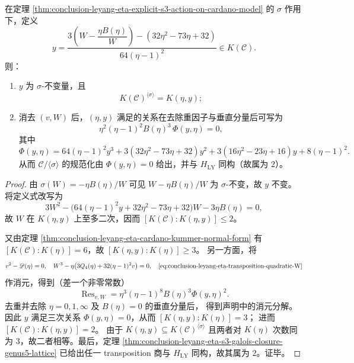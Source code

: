 \begin{theorem}\label{thm:conclusion-leyang-eta-transposition-quotient-explicit-generator}
在定理 \ref{thm:conclusion-leyang-eta-explicit-s3-action-on-cardano-model}
的 \(\sigma\) 作用下，定义
\[
y=\frac{3\left(W-\dfrac{\eta B(\eta)}{W}\right)-(32\eta^2-73\eta+32)}
{64(\eta-1)^2}\in K(\mathcal C).
\]
则：
\begin{enumerate}
  \item \(y\) 为 \(\sigma\)-不变量，且
  \[
  K(\mathcal C)^{\langle\sigma\rangle}=K(\eta,y);
  \]
  \item 消去 \((v,W)\) 后，\((\eta,y)\) 满足的关系在去除重因子与垂直分量后可写为
  \[
  \eta^2(\eta-1)^2B(\eta)^3\,
  \Phi(y,\eta)=0,
  \]
  其中
  \[
  \Phi(y,\eta)
  =64(\eta-1)^2y^3+3(32\eta^2-73\eta+32)y^2
  +3(16\eta^2-23\eta+16)y+8(\eta-1)^2.
  \]
  从而 \(\mathcal C/\langle\sigma\rangle\) 的规范化由
  \(\Phi(y,\eta)=0\) 给出，并与 \(H_{\mathrm{LY}}\) 同构（故属为 \(2\)）。
\end{enumerate}
\end{theorem}
\begin{proof}
由
\(
\sigma(W)=-\eta B(\eta)/W
\)
可见
\(
W-\eta B(\eta)/W
\)
为 \(\sigma\)-不变，故 \(y\) 不变。
将定义式改写为
\begin{equation}\label{eq:conclusion-leyang-eta-transposition-quadratic-W}
3W^2-\bigl(64(\eta-1)^2y+32\eta^2-73\eta+32\bigr)W-3\eta B(\eta)=0,
\end{equation}
故 \(W\) 在 \(K(\eta,y)\) 上至多二次，因而
\(
[K(\mathcal C):K(\eta,y)]\le 2
\)。

又由定理
\ref{thm:conclusion-leyang-eta-cardano-kummer-normal-form}
有 \([K(\mathcal C):K(\eta)]=6\)，故
\(
[K(\eta,y):K(\eta)]\ge 3
\)。
另一方面，将
\[
v^2-\mathscr D(\eta)=0,\quad
W^3-\eta\bigl(3Q_4(\eta)+32(\eta-1)^2v\bigr)=0,\quad
\eqref{eq:conclusion-leyang-eta-transposition-quadratic-W}
\]
作消元，得到（差一个非零常数）
\[
\operatorname{Res}_{v,W}
=\eta^3(\eta-1)^8B(\eta)^3\Phi(y,\eta)^2.
\]
去重并去除 \(\eta=0,1,\infty\) 及 \(B(\eta)=0\) 的垂直分量后，
得到声明中的消元分解。
因此 \(y\) 满足三次关系 \(\Phi(y,\eta)=0\)，从而
\(
[K(\eta,y):K(\eta)]=3
\)；
进而
\(
[K(\mathcal C):K(\eta,y)]=2
\)。
由于 \(K(\eta,y)\subseteq K(\mathcal C)^{\langle\sigma\rangle}\) 且两者对
\(K(\eta)\) 次数同为 \(3\)，故二者相等。最后，定理
\ref{thm:conclusion-leyang-eta-s3-galois-closure-genus5-lattice}
已给出任一 transposition 商与 \(H_{\mathrm{LY}}\) 同构，故其属为 \(2\)。证毕。
\end{proof}

